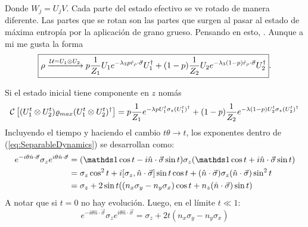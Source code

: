 Donde $W_{j}=U_{j}V$. Cada parte del estado efectivo se ve rotado de manera diferente. Las partes que se rotan son las partes que surgen al pasar al estado de máxima entropía por la aplicación de grano grueso. Pensando en esto, . Aunque a mi me gusta la forma
\begin{equation}\label{eq:SeparableDynamics}
    \boxed{\rho\xrightarrow{\mathcal{U}=U_{1}\otimes U_{2}} p\frac{1}{Z_{1}}U_{1}e^{-\lambda_{3}p\hat{r}_{\rho}\cdot\vec{\sigma}}U_{1}^{\dag}+(1-p)\frac{1}{Z_{2}}U_{2}e^{-\lambda_{3}(1-p)\hat{r}_{\rho}\cdot\vec{\sigma}}U_{2}^{\dag}}.
\end{equation}

Si el estado inicial tiene componente en $z$ nomás
\begin{equation}\label{eq:SeparableZDynamics}
\mathcal{C}\left[(U_{1}^{t}\otimes U_{2}^{t})\varrho_{max}(U_{1}^{t}\otimes U_{2}^{t})^{\dag}\right]=p\frac{1}{Z_{1}}e^{-\lambda p U_{1}^{t}\sigma_{z}(U_{1}^t)^{\dag}}+(1-p)\frac{1}{Z_{2}}e^{-\lambda (1-p)U_{2}^{t}\sigma_{z}(U_{2}^t)^{\dag}}
\end{equation}
Incluyendo el tiempo y haciendo el cambio $t\theta\rightarrow t$, los exponentes dentro de (\ref{eq:SeparableDynamics}) se desarrollan como:
\begin{align*}
    e^{-i\theta \hat{n}\cdot\vec{\sigma}}\sigma_{z}e^{i\theta \hat{n}\cdot\vec{\sigma}}&=(\Id\cos{t}-i\hat{n}\cdot\vec{\sigma}\sin{t})\sigma_{z}(\Id\cos{t}+i\hat{n}\cdot\vec{\sigma}\sin{t})\\
    &=\sigma_{z}\cos^{2}{t}+i[\sigma_{z},\hat{n}\cdot\vec{\sigma}]\sin{t}\cos{t}+(\hat{n}\cdot\vec{\sigma})\sigma_{z}(\hat{n}\cdot\vec{\sigma})\sin^{2}{t}\\
    &=\sigma_{z}+2\sin{t}\qty((n_{x}\sigma_{y}-n_{y}\sigma_{x})\cos{t}+n_{z}(\hat{n}\cdot\vec{\sigma})\sin{t})
\end{align*}
A notar que si $t=0$ no hay evolución. Luego, en el límite $t\ll 1$:
\begin{equation*}
    e^{-i\theta \hat{n}\cdot\vec{\sigma}}\sigma_{z}e^{i\theta \hat{n}\cdot\vec{\sigma}}=\sigma_{z}+2t(n_{x}\sigma_{y}-n_{y}\sigma_{x})
\end{equation*}

